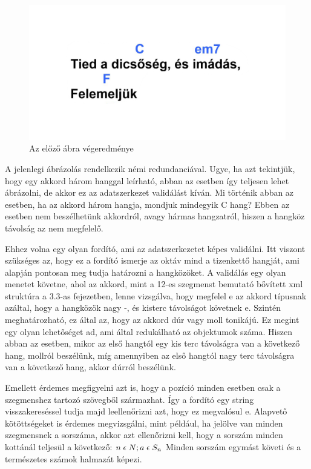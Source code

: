 \begin{figure}[h]
	\includegraphics[scale=0.25]{images/representated_sheet.png}
	\caption{Az előző ábra végeredménye}
	\label{fig:repres2}
\end{figure}

A jelenlegi ábrázolás rendelkezik némi redundanciával. Ugye, ha azt tekintjük, hogy egy akkord három hanggal leírható, abban az esetben így  teljesen lehet ábrázolni, de akkor ez az adatszerkezet validálást kíván. Mi történik abban az esetben, ha az akkord három hangja, mondjuk mindegyik C hang? Ebben az esetben nem beszélhetünk akkordról, avagy hármas hangzatról, hiszen a hangköz távolság az nem megfelelő.
\par
Ehhez volna egy olyan fordító, ami az adatszerkezetet képes validálni. Itt viszont szükséges az, hogy ez a fordító ismerje az oktáv mind a tizenkettő hangját, ami alapján pontosan meg tudja határozni a hangközöket. A validálás egy olyan menetet követne, ahol az akkord, mint a 12-es szegmenst bemutató bővített xml struktúra a 3.3-as fejezetben, lenne vizsgálva, hogy megfelel e az akkord típusnak azáltal, hogy a hangközök nagy -, és kisterc távolságot követnek e. Szintén meghatározható, ez által az, hogy az akkord dúr vagy moll tonikájú. Ez megint egy olyan lehetőséget ad, ami által redukálható az objektumok száma. Hiszen abban az esetben, mikor az első hangtól egy kis terc távolságra van a következő hang, mollról beszélünk, míg amennyiben az első hangtól nagy terc távolságra van a következő hang, akkor dúrról beszélünk.
\par
Emellett érdemes megfigyelni azt is, hogy a pozíció minden esetben csak a szegmenshez tartozó szövegből származhat. Így a fordító egy string visszakereséssel tudja majd leellenőrizni azt, hogy ez megvalósul e. Alapvető kötöttségeket is érdemes megvizsgálni, mint például, ha jelölve van minden szegmensnek a sorszáma, akkor azt ellenőrizni kell, hogy a sorszám minden kottánál teljesül a következő:
$	n\; \epsilon \; N; a\; \epsilon \; S_{n} \\$
Minden sorszám egymást követi és a természetes számok halmazát képezi. 
